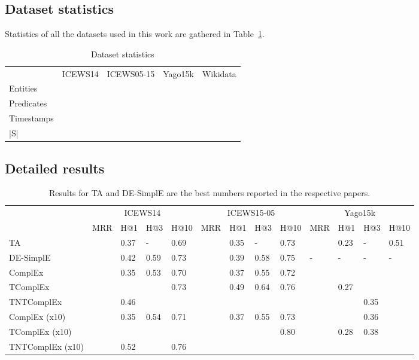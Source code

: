 \documentclass{article}
\begin{document}
\subsection{Dataset statistics}
\label{app:statistics}
Statistics of all the datasets used in this work are gathered in Table~\ref{tab:stats}.
\begin{table}[h]
    \centering
    \begin{tabular}{lcccc}
        \toprule
         {} & ICEWS14 & ICEWS05-15 & Yago15k & Wikidata\\
         Entities &  &  &  &  \\
         Predicates &&& &   \\
         Timestamps & && &  \\
         |S| & && & \\
         \bottomrule
    \end{tabular}
    \caption{Dataset statistics}
    \label{tab:stats}
\end{table}

\subsection{Detailed results}
\begin{table}[h]
\begin{small}
\begin{tabular}{l|p{0.45cm}p{0.45cm}p{0.45cm}p{0.7cm}|p{0.45cm}p{0.45cm}p{0.45cm}p{0.65cm}|p{0.45cm}p{0.45cm}p{0.45cm}p{0.7cm}}
\toprule
{} &  \multicolumn{4}{c}{ICEWS14} & \multicolumn{4}{c}{ICEWS15-05} & \multicolumn{4}{c}{Yago15k}\\
{} & MRR & H@1 & H@3 & H@10 & MRR & H@1 & H@3 & H@10 & MRR & H@1 & H@3 & H@10 \\
TA &  & 0.37 & - & 0.69 &  & 0.35 & - & 0.73 &  & 0.23 & - & 0.51  \\
DE-SimplE &  & 0.42 & 0.59 & 0.73 &  & 0.39 & 0.58 & 0.75 & - & - & - & -\\
ComplEx & & 0.35 & 0.53 & 0.70 & & 0.37 & 0.55 & 0.72 & &  &  &  \\
\midrule
TComplEx &  &  &  & 0.73 & & 0.49 & 0.64 & 0.76 & & 0.27 &  & \\
TNTComplEx &  &0.46 & & &  &  &  &  &  &  & 0.35 & \\
\midrule
ComplEx (x10) &  & 0.35 & 0.54 & 0.71 &  & 0.37 & 0.55 & 0.73 &  &  & 0.36 &  \\
TComplEx (x10) &  &  &  &  &  &  &  & 0.80 &  & 0.28 & 0.38 &  \\
TNTComplEx (x10) &  & 0.52 &  & 0.76 &  &  &  &  &  &  &  & \\
\bottomrule
\end{tabular}
\caption{Results for TA \citep{garcia2018learning} and DE-SimplE \citep{goel2019diachronic} are the best numbers reported in the respective papers.}
\end{small}
\end{table}
\end{document}
